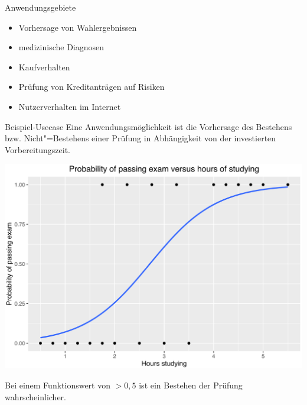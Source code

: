 \documentclass[a4paper, 10pt, twocolumn]{scrartcl}
\newcommand{\spacer}{\vfill}
\begin{document}
\spacer

\begin{block}{Anwendungsgebiete}
\begin{itemize}
\item Vorhersage von Wahlergebnissen
\item medizinische Diagnosen
\item Kaufverhalten
\item Prüfung von Kreditanträgen auf Risiken
\item Nutzerverhalten im Internet
\end{itemize}
\end{block}


\begin{block}{Beispiel-Usecase}
Eine Anwendungsmöglichkeit ist die Vorhersage des Bestehens bzw. Nicht"=Bestehens einer Prüfung in Abhängigkeit von der investierten Vorbereitungszeit.

\begin{center}
\includegraphics[width=1.0\linewidth]{logistisch_bsp}
\end{center}

Bei einem Funktionswert von $> 0,5$ ist ein Bestehen der Prüfung wahrscheinlicher.
\end{block}

\spacer
\end{document}
